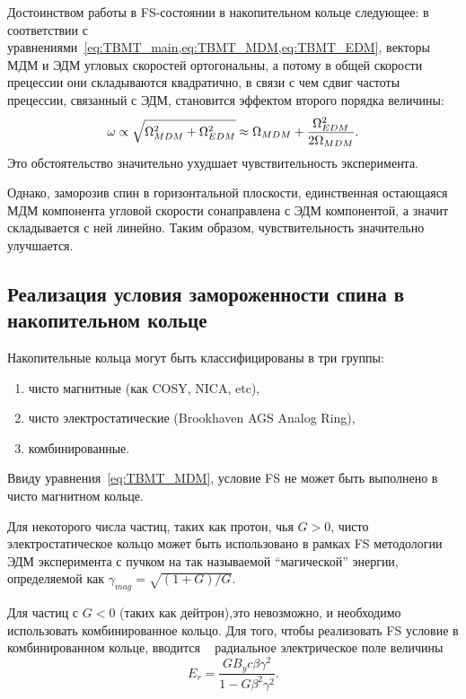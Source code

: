 Достоинством работы в FS-состоянии в накопительном кольце
следующее: в соответствии с
уравнениями~\cref{eq:TBMT_main,eq:TBMT_MDM,eq:TBMT_EDM}, векторы МДМ и
ЭДМ угловых скоростей ортогональны, а потому в общей скорости
прецессии они складываются квадратично, в связи с чем сдвиг частоты
прецессии, связанный с ЭДМ, становится эффектом второго порядка
величины:~\cite[стр.~5]{Mane:SpinWheel}
\[
\omega \propto \sqrt{\Omega_{MDM}^2 + \Omega_{EDM}^2} \approx \Omega_{MDM} + \frac{\Omega_{EDM}^2}{2\Omega_{MDM}}.
\]
Это обстоятельство значительно ухудшает чувствительность эксперимента.

Однако, заморозив спин в горизонтальной плоскости, единственная
остающаяся МДМ компонента угловой скорости сонаправлена с ЭДМ
компонентой, а значит складывается с ней линейно. Таким образом,
чувствительность значительно улучшается.

\subsection{Реализация условия замороженности спина в накопительном кольце}\label{sec:FS_in_a_ring}
Накопительные кольца могут быть классифицированы в три группы:
\begin{enumerate}
	\item чисто магнитные (как COSY, NICA, etc),
	\item чисто электростатические (Brookhaven AGS Analog Ring),
	\item комбинированные.
\end{enumerate}

Ввиду уравнения~\eqref{eq:TBMT_MDM}, условие FS не может быть
выполнено в чисто магнитном кольце.

Для некоторого числа частиц, таких как протон, чья $G>0$, чисто
электростатическое кольцо может быть использовано в рамках FS
методологии ЭДМ эксперимента с пучком на так называемой ``магической''
энергии, определяемой как $\gamma_{mag} = \sqrt{(1+G)/G}$.

Для частиц с $G<0$ (таких как дейтрон),это невозможно, и необходимо
использовать комбинированное кольцо. Для того, чтобы реализовать FS
условие в комбинированном кольце, вводится ~\cite{BNL:Deuteron2008} радиальное электрическое
поле величины
\begin{equation}\label{eq:FS_Er}
E_r = \frac{GB_yc\beta\gamma^2}{1-G\beta^2\gamma^2}.
\end{equation}